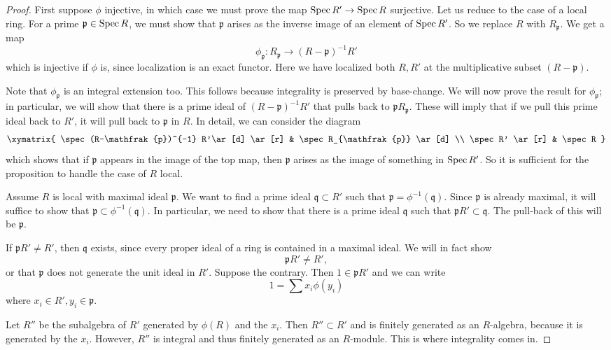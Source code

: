 \begin{proof} First suppose $\phi$ injective, in which case we must prove the
map $\operatorname{Spec} R' \to \operatorname{Spec} R$ surjective.
Let us reduce to the case of a local ring.
For a prime $\mathfrak{p} \in \operatorname{Spec} R$, we must show that $\mathfrak{p}$
arises as the inverse image of an element of $\operatorname{Spec} R'$.
So we replace $R$ with $R_{\mathfrak{p}}$.  We get a map
\[ \phi_{\mathfrak{p}}: R_{\mathfrak{p}} \to (R- \mathfrak{p})^{-1} R'  \]
which is injective if $\phi$ is, since localization is an exact functor. Here
we
have localized both $R, R'$ at the multiplicative subset $(R - \mathfrak{p})$.

Note that $\phi_{\mathfrak{p}}$ is an integral extension too. This follows
because integrality is preserved by base-change.
We will now prove the result for $\phi_{\mathfrak{p}}$; in particular, we
will show
that there is a prime ideal of $(R- \mathfrak{p})^{-1} R'$ that pulls back to
$\mathfrak{p}R_{\mathfrak{p}}$. These will imply that if we pull this prime
ideal back to $R'$, it will pull back to $\mathfrak{p}$ in $R$. In detail, we
can consider the diagram
\[ \xymatrix{
\spec (R-\mathfrak{p})^{-1} R'\ar[d]  \ar[r] & \spec R_{\mathfrak{p}} \ar[d] \\
\spec R' \ar[r] &  \spec R
}\]
which shows that if $\mathfrak{p}$ appears in the image of the top map, then
$\mathfrak{p}$
arises as the image of something in $\operatorname{Spec} R'$.
So it is sufficient for the proposition to handle the case of $R$ local.



Assume $R$ is local with maximal ideal $\mathfrak{p}$. We want to find a prime ideal $\mathfrak{q} \subset R'$ such that
$\mathfrak{p}  = \phi^{-1}(\mathfrak{q})$. Since $\mathfrak{p}$ is already
maximal, it will suffice to show that $\mathfrak{p} \subset
\phi^{-1}(\mathfrak{q})$. In particular, we need to show that there is a prime
ideal $\mathfrak{q}$ such that
\( \mathfrak{p} R' \subset \mathfrak{q}.  \)
The pull-back of this will be $\mathfrak{p}$.

If $\mathfrak{p}R' \neq R'$, then
$\mathfrak{q}$ exists, since every proper ideal of a ring is contained in a
maximal ideal.  We will in fact show
\[ \mathfrak{p} R' \neq R', \]
or that $\mathfrak{p}$ does not generate the unit ideal in $R'$. Suppose the
contrary. Then $1 \in \mathfrak{p}R'$ and we can write
\[ 1 = \sum x_i \phi(y_i)  \]
where $x_i \in R', y_i \in \mathfrak{p}$.

Let $R''$ be the subalgebra of $R'$ generated by $\phi(R)$ and the $x_i$. Then
$R'' \subset R'$ and is finitely generated as an $R$-algebra, because it is generated by
the $x_i$. However, $R''$ is integral and thus finitely generated as an
$R$-module. This
is where integrality comes in.


\end{proof}
